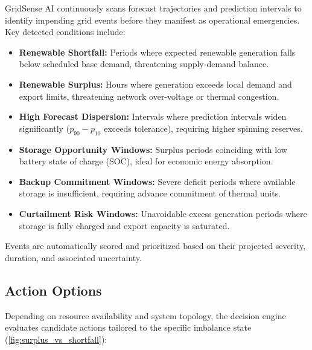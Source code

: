 GridSense AI continuously scans forecast trajectories and prediction intervals to identify impending grid events before they manifest as operational emergencies. Key detected conditions include:
\begin{itemize}[leftmargin=1.8em, itemsep=0.2em]
    \item \textbf{Renewable Shortfall:} Periods where expected renewable generation falls below scheduled base demand, threatening supply-demand balance.
    \item \textbf{Renewable Surplus:} Hours where generation exceeds local demand and export limits, threatening network over-voltage or thermal congestion.
    \item \textbf{High Forecast Dispersion:} Intervals where prediction intervals widen significantly ($p_{90} - p_{10}$ exceeds tolerance), requiring higher spinning reserves.
    \item \textbf{Storage Opportunity Windows:} Surplus periods coinciding with low battery state of charge (SOC), ideal for economic energy absorption.
    \item \textbf{Backup Commitment Windows:} Severe deficit periods where available storage is insufficient, requiring advance commitment of thermal units.
    \item \textbf{Curtailment Risk Windows:} Unavoidable excess generation periods where storage is fully charged and export capacity is saturated.
\end{itemize}

Events are automatically scored and prioritized based on their projected severity, duration, and associated uncertainty.

\subsection{Action Options}
\label{subsec:action_options}

Depending on resource availability and system topology, the decision engine evaluates candidate actions tailored to the specific imbalance state (\cref{fig:surplus_vs_shortfall}):

